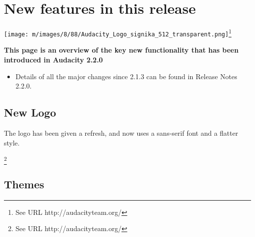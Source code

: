 

		
			
												

				
\chapter{New features in this release}

\label{f0}								


{\centering \texttt{[image: m/images/8/88/Audacity\_Logo\_signika\_512\_transparent.png]}\footnote{See URL http://audacityteam.org/}}

\textbf{This page is an overview of the key new functionality that has been introduced in Audacity 2.2.0}

\begin{itemize}
\item  
Details of all the major changes since 2.1.3 can be found in Release Notes 2.2.0.


\end{itemize}

\section{
New Logo
}


The logo has been given a refresh, and now uses a sans-serif font and a flatter style.

\footnote{See URL http://audacityteam.org/}


\section{
Themes
}



